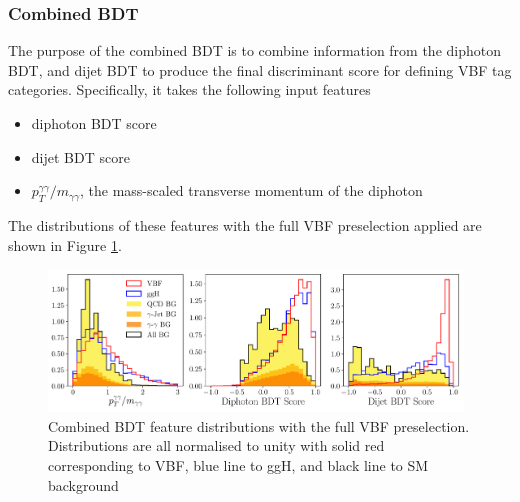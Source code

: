 \subsubsection{Combined BDT}
The purpose of the combined BDT is to combine information from the diphoton BDT, and dijet BDT to produce the final discriminant score for defining VBF tag categories. 
Specifically, it takes the following input features
\begin{itemize}[leftmargin=.5in,noitemsep]
    \item diphoton BDT score
    \item dijet BDT score
    \item $p_{T}^{\gamma\gamma}/m_{\gamma\gamma}$, the mass-scaled transverse momentum of the diphoton
\end{itemize}
The distributions of these features with the full VBF preselection applied are shown in Figure \ref{fig:event_categorisaton:combined_bdt_features}.
\begin{figure}[h!]
    \includegraphics[width=0.98\textwidth]{figures/event_selection/combined_BDT_features_splitBG_PS.pdf}
    \caption{Combined BDT feature distributions with the full VBF preselection. Distributions are all normalised to unity with solid red corresponding to VBF, blue line to ggH, and black line to SM background}
    \label{fig:event_categorisaton:combined_bdt_features}
\end{figure}


